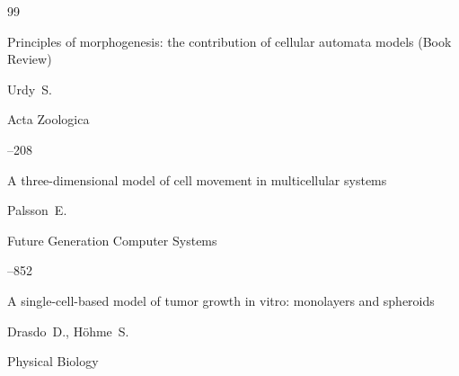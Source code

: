 \newpage



\makeentitle










\newpage



\begin{thebibliography}{99}




\paper Principles of morphogenesis: the contribution of cellular automata models (Book Review)

\by Urdy~S.

\jour Acta Zoologica




--208





\paper  A three-dimensional model of cell movement in multicellular systems

\by Palsson~E.

\jour Future Generation Computer Systems




--852




 


\paper A single-cell-based model of tumor growth in vitro: monolayers and spheroids

\by Drasdo~D., H\"ohme~S.

\jour Physical Biology


\end{thebibliography}
